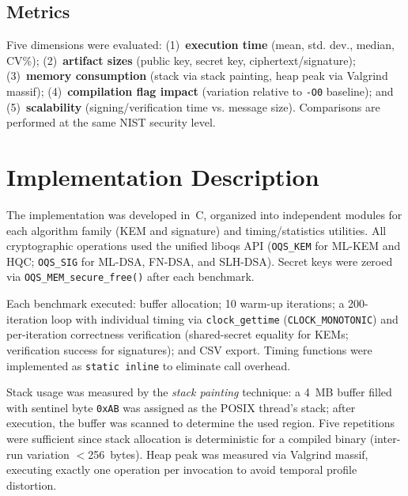 \documentclass[12pt]{article}
\begin{document}
\subsection{Metrics}
Five dimensions were evaluated: (1)~\textbf{execution time} (mean, std.
dev., median, CV\%); (2)~\textbf{artifact sizes} (public key, secret key,
ciphertext/signature); (3)~\textbf{memory consumption} (stack via stack
painting, heap peak via Valgrind massif); (4)~\textbf{compilation flag
impact} (variation relative to \texttt{-O0} baseline); and
(5)~\textbf{scalability} (signing/verification time vs. message size).
Comparisons are performed at the same NIST security level.

\section{Implementation Description}
\label{sec:Implementacao}
The implementation was developed in~C, organized into independent modules
for each algorithm family (KEM and signature) and timing/statistics
utilities. All cryptographic operations used the unified liboqs API
(\texttt{OQS\_KEM} for ML-KEM and HQC; \texttt{OQS\_SIG} for ML-DSA,
FN-DSA, and SLH-DSA). Secret keys were zeroed via
\texttt{OQS\_MEM\_secure\_free()} after each benchmark.

Each benchmark executed: buffer allocation; 10 warm-up iterations;
a 200-iteration loop with individual timing via \texttt{clock\_gettime}
(\texttt{CLOCK\_MONOTONIC}) and per-iteration correctness verification
(shared-secret equality for KEMs; verification success for signatures);
and CSV export. Timing functions were implemented as \texttt{static inline}
to eliminate call overhead.

Stack usage was measured by the \textit{stack painting} technique: a 4~MB
buffer filled with sentinel byte \texttt{0xAB} was assigned as the POSIX
thread's stack; after execution, the buffer was scanned to determine the
used region. Five repetitions were sufficient since stack allocation is
deterministic for a compiled binary (inter-run variation $<$256~bytes). Heap
peak was measured via Valgrind massif, executing exactly one operation per
invocation to avoid temporal profile distortion.

\end{document}
